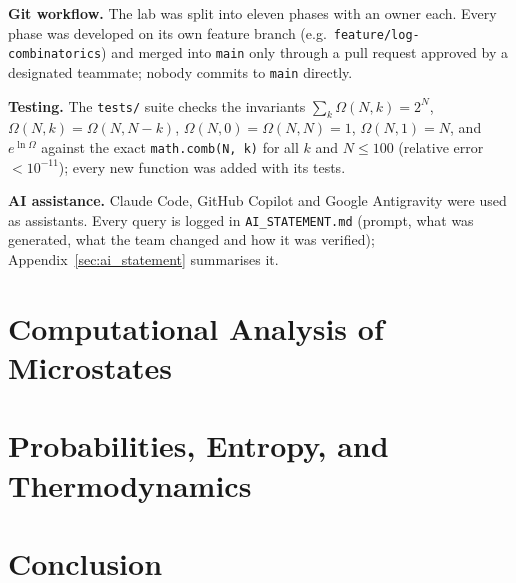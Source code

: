 \documentclass[11pt,a4paper]{article}
\begin{document}
\textbf{Git workflow.} The lab was split into eleven phases with an owner each. Every phase was developed on its own feature branch (e.g.\ \texttt{feature/log-combinatorics}) and merged into \texttt{main} only through a pull request approved by a designated teammate; nobody commits to \texttt{main} directly.

\textbf{Testing.} The \texttt{tests/} suite checks the invariants $\sum_k\Omega(N,k)=2^N$, $\Omega(N,k)=\Omega(N,N-k)$, $\Omega(N,0)=\Omega(N,N)=1$, $\Omega(N,1)=N$, and $e^{\ln\Omega}$ against the exact \texttt{math.comb(N, k)} for all $k$ and $N\le100$ (relative error $<10^{-11}$); every new function was added with its tests.

\textbf{AI assistance.} Claude Code, GitHub Copilot and Google Antigravity were used as assistants. Every query is logged in \texttt{AI\_STATEMENT.md} (prompt, what was generated, what the team changed and how it was verified); Appendix~\ref{sec:ai_statement} summarises it.

\section{Computational Analysis of Microstates}
\label{sec:microstates}




\section{Probabilities, Entropy, and Thermodynamics}
\label{sec:thermodynamics}





\section{Conclusion}
\label{sec:conclusion}
\end{document}
